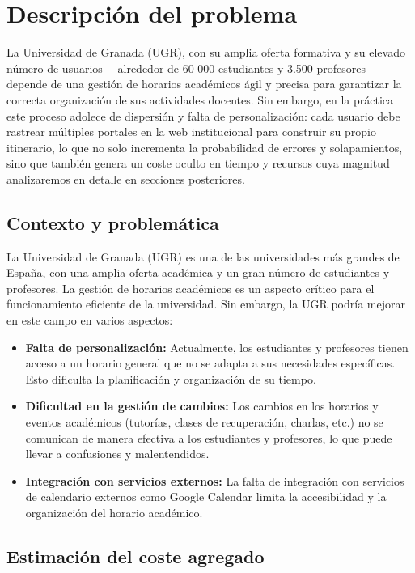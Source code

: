 \chapter{Descripción del problema}\label{cap:descripcion}

La Universidad de Granada (UGR), con su amplia oferta formativa y su elevado número de usuarios —alrededor de 60 000 estudiantes y 3.500 profesores \cite{webPromocionUGR}— depende de una gestión de horarios académicos ágil y precisa para garantizar la correcta organización de sus actividades docentes. Sin embargo, en la práctica este proceso adolece de dispersión y falta de personalización: cada usuario debe rastrear múltiples portales en la web institucional para construir su propio itinerario, lo que no solo incrementa la probabilidad de errores y solapamientos, sino que también genera un coste oculto en tiempo y recursos cuya magnitud analizaremos en detalle en secciones posteriores.

\section{Contexto y problemática}

La Universidad de Granada (UGR) es una de las universidades más grandes de España, con una amplia oferta académica y un gran número de estudiantes y profesores. La gestión de horarios académicos es un aspecto crítico para el funcionamiento eficiente de la universidad. Sin embargo, la UGR podría mejorar en este campo en varios aspectos:

\begin{itemize}
    \item \textbf{Falta de personalización:} Actualmente, los estudiantes y profesores tienen acceso a un horario general que no se adapta a sus necesidades específicas. Esto dificulta la planificación y organización de su tiempo.
    \item \textbf{Dificultad en la gestión de cambios:} Los cambios en los horarios y eventos académicos (tutorías, clases de recuperación, charlas, etc.) no se comunican de manera efectiva a los estudiantes y profesores, lo que puede llevar a confusiones y malentendidos.
    \item \textbf{Integración con servicios externos:} La falta de integración con servicios de calendario externos como Google Calendar limita la accesibilidad y la organización del horario académico.
\end{itemize}

\section{Estimación del coste agregado}

